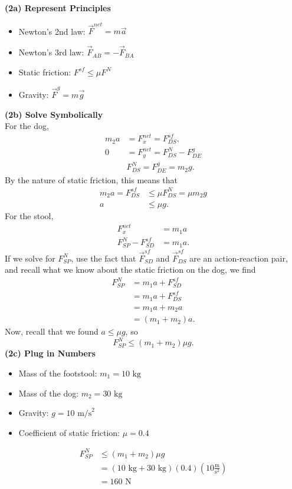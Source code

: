 \documentclass[]{article}
\begin{document}
\newpage
\begin{TeacherMargin}
\noindent\textbf{(2a) Represent Principles}
\begin{itemize}
	\item Newton's 2nd law: $\vec{F}^{net}=m\vec{a}$
	\item Newton's 3rd law: $\vec{F}_{AB} = -\vec{F}_{BA}$
	\item Static friction: $F^{sf} \leq \mu F^{N}$
	\item Gravity: $\vec{F}^{g} = m\vec{g}$
\end{itemize}
\textbf{(2b) Solve Symbolically} \\
For the dog,
\begin{align*}
	m_{2}a & = F^{net}_{x} = F^{sf}_{DS}, \\
	0 & = F^{net}_{y} = F^{N}_{DS}-F^{g}_{DE} \\
	& F^{N}_{DS}=F^{g}_{DE}=m_{2}g.
\end{align*}
By the nature of static friction, this means that
\begin{align*}
	m_{2}a = F^{sf}_{DS} & \leq \mu F^{N}_{DS} = \mu m_{2}g \\
	a & \leq \mu g.
\end{align*}
For the stool,
\begin{align*}
	F^{net}_{x} & = m_{1}a \\
	F^{N}_{SP} - F^{sf}_{SD} & = m_{1}a.
\end{align*}
If we solve for $F^{N}_{SP}$, use the fact that $\vec{F}^{sf}_{SD}$ and $\vec{F}^{sf}_{DS}$ are an action-reaction pair, and recall what we know about the static friction on the dog, we find
\begin{align*}
	F^{N}_{SP} & = m_{1}a + F^{sf}_{SD} \\
	& = m_{1}a + F^{sf}_{DS} \\
	& = m_{1}a + m_{2}a \\
	& = (m_{1}+m_{2})a.
\end{align*}
Now, recall that we found $a\leq\mu g$, so
\[
F^{N}_{SP} \leq (m_{1}+m_{2})\mu g.
\]
\textbf{(2c) Plug in Numbers}
\begin{itemize}
	\item Mass of the footstool: $m_{1}=10\text{ kg}$
	\item Mass of the dog: $m_{2}=30\text{ kg}$
	\item Gravity: $g=10\text{ m/s}^{2}$
	\item Coefficient of static friction: $\mu=0.4$
\end{itemize}
\begin{align*}
	F^{N}_{SP} & \leq (m_{1}+m_{2})\mu g \\
	& = (10\text{ kg}+30\text{ kg})(0.4)\left(10\frac{\text{m}}{\text{s}^{2}}\right) \\
	& = 160\text{ N}
\end{align*}
\end{TeacherMargin}
\end{document}
